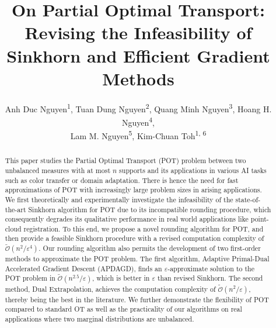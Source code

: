 \documentclass[letterpaper]{article} %
\title{On Partial Optimal Transport: Revising the Infeasibility of Sinkhorn and Efficient Gradient Methods}
\author{
    Anh Duc Nguyen\textsuperscript{\rm 1},
    Tuan Dung Nguyen\textsuperscript{\rm 2},
     Quang Minh Nguyen\textsuperscript{\rm 3},
    Hoang H. Nguyen\textsuperscript{\rm 4}, \\
    Lam M. Nguyen\textsuperscript{\rm 5},
    Kim-Chuan Toh\textsuperscript{\rm 1, 6}
}
\theoremstyle{plain}
\theoremstyle{definition}
\theoremstyle{remark}
\begin{document}
\maketitle
\begin{abstract}
This paper studies the Partial Optimal Transport (POT) problem between two unbalanced measures with at most $n$ supports and its applications in various AI tasks such as color transfer or domain adaptation. There is hence the need for fast approximations of POT with increasingly large problem sizes in arising applications. We first theoretically and experimentally investigate the infeasibility of the state-of-the-art Sinkhorn algorithm for POT due to its incompatible rounding procedure, which consequently degrades its qualitative performance in real world applications like point-cloud registration. To this end, we propose a novel rounding algorithm for POT, and then provide a feasible Sinkhorn procedure with a revised computation complexity of $\mathcal{\widetilde O}(n^2/\varepsilon^4)$. Our rounding algorithm also permits the development of two first-order methods to approximate the POT problem. The first algorithm, Adaptive Primal-Dual Accelerated Gradient Descent (APDAGD), finds an $\varepsilon$-approximate solution to the POT problem in $\mathcal{\widetilde O}(n^{2.5}/\varepsilon)$, which is better in $\varepsilon$ than revised Sinkhorn. The second method, Dual Extrapolation, achieves the computation complexity of $\mathcal{\widetilde O}(n^2/\varepsilon)$, thereby being the best in the literature. We further demonstrate the flexibility of POT compared to standard OT as well as the practicality of our algorithms on real applications where two marginal distributions are unbalanced.
\end{abstract}











\onecolumn



\end{document}
